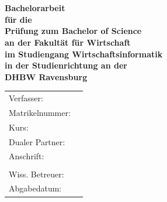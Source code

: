 \begin{titlepage}
	\begin{center}
		\vspace*{2cm}
		\LARGE\bf\myTopic\\
		\Large\rm\mySubTopic\\
		\vspace*{3cm}
		\bf Bachelorarbeit\\
		\normalsize\rm
		\vspace*{0.5cm}\singlespacing
		für die\\
		Prüfung zum Bachelor of Science\\
		\vspace*{0.5cm}\singlespacing
		an der Fakultät für Wirtschaft\\
		im Studiengang Wirtschaftsinformatik\\
		in der Studienrichtung \myFieldOfStudy
		\vspace*{0.5cm}\singlespacing
		an der\\
		DHBW Ravensburg
		\vfill
	\end{center}
	\begin{tabular}{ll}
		Verfasser:&\myAutor\\
		Matrikelnummer:&\myMatNr\\
		Kurs:&\myKurs\\
		Dualer Partner:&\myCompany\\
		Anschrift:&\myCompanyAddressStreet\\
		&\myCompanyAddressCity\\
		Wiss. Betreuer:&\myProf\\
		Abgabedatum:&\myEndDate\\
	\end{tabular}
\end{titlepage}
\newpage
\setcounter{page}{2}

